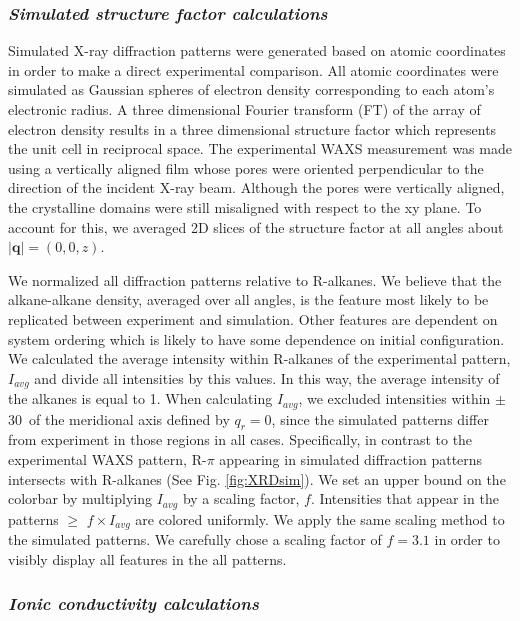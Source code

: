 \documentclass[journal=jpcbfk,manusciprt=article]{achemso}
\begin{document}
  \subsubsection{\textit{Simulated structure factor calculations}}

  Simulated X-ray diffraction patterns were generated based on atomic
  coordinates in order to make a direct experimental comparison. All atomic
  coordinates were simulated as Gaussian spheres of electron density
  corresponding to each atom's electronic radius. A three dimensional Fourier
  transform (FT) of the array of electron density results in a three dimensional
  structure factor which represents the unit cell in reciprocal space. The
  experimental WAXS measurement was made using a vertically aligned film whose 
  pores were oriented perpendicular to the direction of the incident X-ray beam. 
  Although the pores were vertically aligned, the crystalline domains were still
  misaligned with respect to the xy plane. To account for this, we averaged
  2D slices of the structure factor at all angles about $|\mathbf{q}| = (0, 0, z)$. 

  We normalized all diffraction patterns relative to R-alkanes. We believe that the
  alkane-alkane density, averaged over all angles, is the feature most likely to be
  replicated between experiment and simulation. Other features are dependent on 
  system ordering which is likely to have some dependence on initial configuration. 
  We calculated the average intensity within R-alkanes of the experimental pattern,
  $I_{avg}$ and divide all intensities by this values. In this way, the average intensity
  of the alkanes is equal to 1. When calculating $I_{avg}$, we excluded intensities 
  within $\pm$ 30\degree~of the meridional axis defined by $q_r=0$, since the simulated
  patterns differ from experiment in those regions in all cases. Specifically, in contrast
  to the experimental WAXS pattern, R-$\pi$ appearing in simulated diffraction patterns 
  intersects with R-alkanes (See Fig. \ref{fig:XRDsim}). We set
  an upper bound on the colorbar by multiplying $I_{avg}$ by a scaling factor, $f$. 
  Intensities that appear in the patterns $\geq$ $f\times I_{avg}$ are colored uniformly. 
  We apply the same scaling method to the simulated patterns. We carefully chose a scaling
  factor of $f=3.1$ in order to visibly display all features in the all patterns.

  \subsubsection{\textit{Ionic conductivity calculations}}
\end{document}
